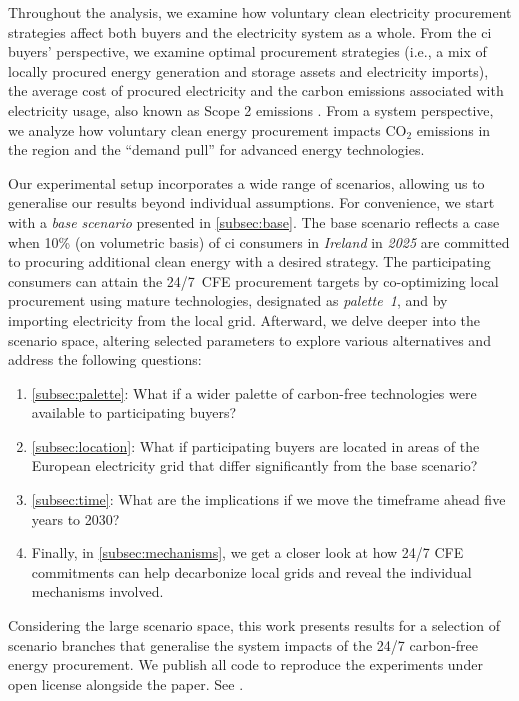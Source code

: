 Throughout the analysis, we examine how voluntary clean electricity procurement strategies affect both buyers and the electricity system as a whole.
From the \gls{ci} buyers' perspective, we examine optimal procurement strategies (i.e., a mix of locally procured energy generation and storage assets and electricity imports), the average cost of procured electricity and the carbon emissions associated with electricity usage, also known as Scope 2 emissions \cite{GHGProtocolScope2}.
From a system perspective, we analyze how voluntary clean energy procurement impacts CO$_2$ emissions in the region and the \enquote{demand pull} for advanced energy technologies.

Our experimental setup incorporates a wide range of scenarios, allowing us to generalise our results beyond individual assumptions.
For convenience, we start with a \textit{base scenario} presented in \cref{subsec:base}.
The base scenario reflects a case when 10\% (on volumetric basis) of \gls{ci} consumers in \textit{Ireland} in \textit{2025} are committed to procuring additional clean energy with a desired strategy.
The participating consumers can attain the 24/7~CFE procurement targets by co-optimizing local procurement using mature technologies, designated as \textit{palette~1}, and by importing electricity from the local grid. 
Afterward, we delve deeper into the scenario space, altering selected parameters to explore various alternatives and address the following questions:

\begin{enumerate}[-]
\item \cref{subsec:palette}: What if a wider palette of carbon-free technologies were available to participating buyers?
\item \cref{subsec:location}: What if participating buyers are located in areas of the European electricity grid that differ significantly from the base scenario?
\item \cref{subsec:time}: What are the implications if we move the timeframe ahead five years to 2030?
\item Finally, in \cref{subsec:mechanisms}, we get a closer look at how 24/7 CFE commitments can help decarbonize local grids and reveal the individual mechanisms involved.
\end{enumerate}

Considering the large scenario space, this work presents results for a selection of scenario branches that generalise the system impacts of the 24/7 carbon-free energy procurement.
We publish all code to reproduce the experiments under open license alongside the paper. 
See .

